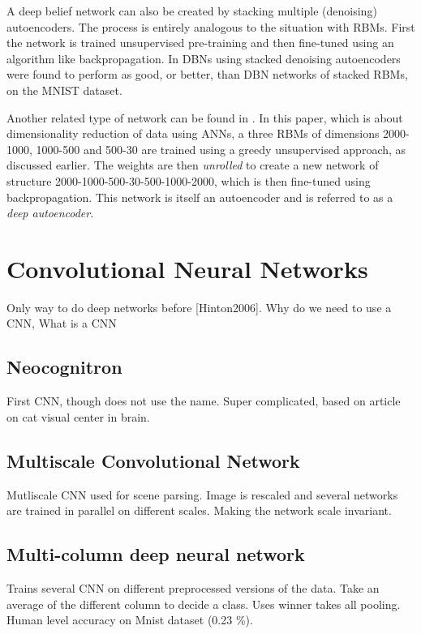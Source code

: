 \documentclass[11pt]{article}
\begin{document}
A deep belief network can also be created by stacking multiple (denoising) autoencoders.  The process is entirely analogous to the situation with RBMs.  First the network is trained unsupervised pre-training and then fine-tuned using an algorithm like backpropagation.  In \cite{bengio07} DBNs using stacked denoising autoencoders were found to perform as good, or better, than DBN networks of stacked RBMs, on the MNIST dataset.

Another related type of network can be found in \cite{hinton06reducing}.  In this paper, which is about dimensionality reduction of data using ANNs, a three RBMs of dimensions 2000-1000, 1000-500 and 500-30 are trained using a greedy unsupervised approach, as discussed earlier.  The weights are then \textit{unrolled} to create a new network of structure 2000-1000-500-30-500-1000-2000, which is then fine-tuned using backpropagation.  This network is itself an autoencoder and is referred to as a \textit{deep autoencoder}.

\section{Convolutional Neural Networks}

Only way to do deep networks before [Hinton2006].
Why do we need to use a CNN,
What is a CNN

\subsection{Neocognitron}

First CNN, though does not use the name.
Super complicated, based on article on cat visual center in brain.

\subsection{Multiscale Convolutional Network}

Mutliscale CNN used for scene parsing. Image is rescaled and several
networks are trained in parallel on different scales. Making the network
scale invariant.



\subsection{Multi-column deep neural network}

Trains several CNN on different preprocessed versions of the data. Take an average
of the different column to decide a class. Uses winner takes all pooling.
Human level accuracy on Mnist dataset (0.23 \%).
\end{document}
